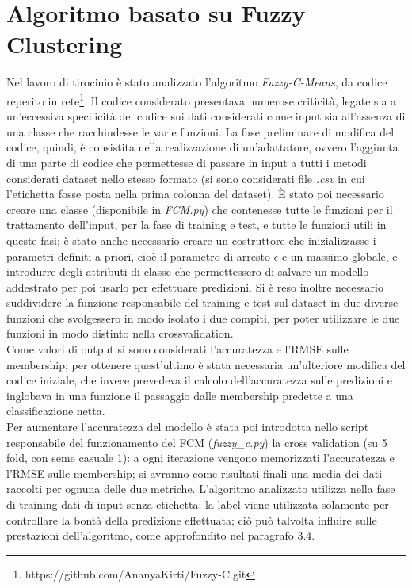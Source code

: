 \documentclass[oneside, openany]{book}
\begin{document}
	\section{Algoritmo basato su Fuzzy Clustering}
	Nel lavoro di tirocinio è stato analizzato l'algoritmo \textit{Fuzzy-C-Means}, da codice reperito in rete\footnote{https://github.com/AnanyaKirti/Fuzzy-C.git}. Il codice considerato presentava numerose criticità, legate sia a un'eccessiva specificità del codice sui dati considerati come input sia all'assenza di una classe che racchiudesse le varie funzioni. La fase preliminare di modifica del codice, quindi, è consistita nella realizzazione di un'adattatore, ovvero l'aggiunta di una parte di codice che permettesse di passare in input a tutti i metodi considerati dataset nello stesso formato (si sono considerati file \textit{.csv} in cui l'etichetta fosse posta nella prima colonna del dataset). \`E stato poi necessario creare una classe (disponibile in \textit{FCM.py}) che contenesse tutte le funzioni per il trattamento dell'input, per la fase di training e test, e tutte le funzioni utili in queste fasi; è stato anche necessario creare un costruttore che inizializzasse i parametri definiti a priori, cioè il parametro di arresto $\epsilon$ e un massimo globale, e introdurre degli attributi di classe che permettessero di salvare un modello addestrato per poi usarlo per effettuare predizioni. Si è reso inoltre necessario suddividere la funzione responsabile del training e test sul dataset in due diverse funzioni che svolgessero in modo isolato i due compiti, per poter utilizzare le due funzioni in modo distinto nella crossvalidation.\\
	Come valori di output si sono considerati l'accuratezza e l'RMSE sulle membership; per ottenere quest'ultimo è stata necessaria un'ulteriore modifica del codice iniziale, che invece prevedeva il calcolo dell'accuratezza sulle predizioni e inglobava in una funzione il passaggio dalle membership predette a una classificazione netta.\\ 
	Per aumentare l'accuratezza del modello è stata poi introdotta nello script responsabile del funzionamento del FCM (\textit{fuzzy\_c.py}) la cross validation (su 5 fold, con seme casuale 1): a ogni iterazione vengono memorizzati l'accuratezza e l'RMSE sulle membership; si avranno come risultati finali una media dei dati raccolti per ognuna delle due metriche.
	L'algoritmo analizzato utilizza nella fase di training dati di input senza etichetta: la label viene utilizzata solamente per controllare la bontà della predizione effettuata; ciò può talvolta influire sulle prestazioni dell'algoritmo, come approfondito nel paragrafo 3.4.
	
\end{document}
